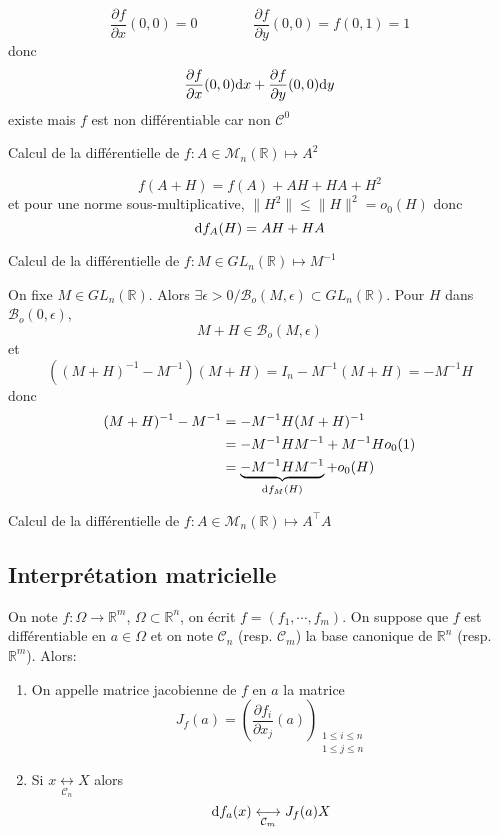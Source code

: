 \[
    \frac{\partial f}{\partial x}(0, 0)=0 \qquad\qquad \frac{\partial f}{\partial y}(0, 0)=f(0, 1)=1
\]
donc \[
    \frac{\partial f}{\partial x}(0, 0) \mathrm{d} x+ \frac{\partial f}{\partial y}(0, 0)\mathrm{d} y
\]
existe mais $f$ est non différentiable car non $\mathcal C^0$

\begin{ex} Calcul de la différentielle de
    {$f:A\in\mathcal M_n(\mathbb R)\longmapsto A^2$}
\end{ex}

\[
    f(A+H)=f(A)+AH+HA+H^2
\]
et pour une norme sous-multiplicative, $\|H^2\|\leq \|H\|^2=o_0(H)$ donc \[
    \mathrm{d} f_A(H)=AH+HA
\]

\begin{ex} Calcul de la différentielle de
    {$f:M\in GL_n(\mathbb R)\longmapsto M^{-1}$}
\end{ex}

On fixe $M\in GL_n(\mathbb R)$. Alors $\exists \epsilon >0 / \mathcal B_o(M, \epsilon)\subset GL_n(\mathbb R)$. Pour $H$ dans $\mathcal B_o(0, \epsilon)$, \[
    M+H\in\mathcal B_o(M, \epsilon)
\]
et \[
    \left((M+H)^{-1}-M^{-1}\right)(M+H)=I_n-M^{-1}(M+H)=-M^{-1}H
\] donc
\begin{align*}
    (M+H)^{-1}-M^{-1}&=-M^{-1}H(M+H)^{-1}\\&=-M^{-1}HM^{-1}+M^{-1}Ho_0(1)\\&=\underbrace{-M^{-1}HM^{-1}}_{\mathrm{d} f_M(H)}+o_0(H)
\end{align*}

\begin{exo} Calcul de la différentielle de
    {$f:A\in\mathcal M_n(\mathbb R)\longmapsto A^\intercal A$}
\end{exo}

\subsection{Interprétation matricielle}

\begin{thmdef}
    On note $f:\Omega\to \mathbb R^m$, $\Omega\subset \mathbb R^n$, on écrit $f=(f_1, \cdots, f_m)$. On suppose que $f$ est différentiable en $a\in\Omega$ et on note $\mathcal C_n$ (resp. $\mathcal C_m$) la base canonique de $\mathbb R^n$ (resp. $\mathbb R^m$). Alors: \begin{enumerate}
        \item On appelle matrice jacobienne de $f$ en $a$ la matrice \[
                J_f(a)=\left(\frac{\partial f_i}{\partial x_j}(a)\right)_{\substack{1\leq i\leq n\\ 1\leq j\leq n}}
            \]
        \item Si $x\underset{\mathcal C_n}{\longleftrightarrow}X$ alors \[
                \mathrm{d} f_a(x)\underset{\mathcal C_m}\longleftrightarrow J_f(a)X
            \]
    \end{enumerate}
\end{thmdef}

